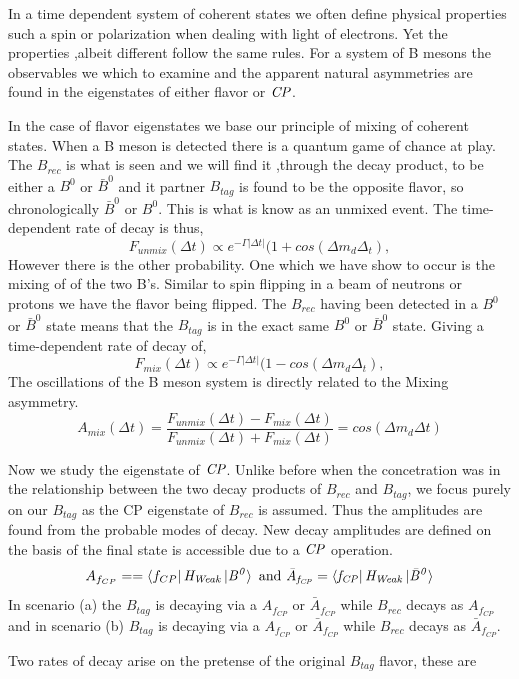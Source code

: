 In a time dependent system of coherent states we often define physical properties such a spin or polarization when dealing with light of electrons. Yet the properties ,albeit different follow the same rules. For a system of B mesons the observables we which to examine and the apparent natural asymmetries are found in the eigenstates of either flavor or $\it{CP}$. 

In the case of flavor eigenstates we base our principle of mixing of coherent states. When a B meson is detected there is a quantum game of chance at play. The $B_{rec}$ is what is seen and we will find it ,through the decay product, to be either a $B^0$ or $\bar{B}^0$ and it partner $B_{tag}$ is found to be the opposite flavor, so  chronologically $\bar{B}^0$ or $B^0$. This is what is know as an unmixed event. The time-dependent rate of decay is thus,
\[F_{unmix}(\Delta t) \propto e^{-\Gamma\left|\Delta t\right|}(1 + cos(\Delta m_d \Delta_t),\]
However there is the other probability. One which we have show to occur is the mixing of of the two B's. Similar to spin flipping in a beam of neutrons or protons we have the flavor being flipped. The $B_{rec}$ having been detected in a $B^0$ or $\bar{B}^0$ state means that the $B_{tag}$ is in the exact same $B^0$ or $\bar{B}^0$ state. Giving a time-dependent rate of decay of,
\[F_{mix}(\Delta t) \propto e^{-\Gamma\left|\Delta t\right|}(1 - cos(\Delta m_d \Delta_t),\]
The oscillations of the B meson system is directly related to the Mixing asymmetry.
\[A_{mix}(\Delta t) = \frac{F_{unmix}(\Delta t)-F_{mix}(\Delta t)}{F_{unmix}(\Delta t)+F_{mix}(\Delta t)} = cos(\Delta m_d\Delta t) \]

Now we study the eigenstate of $\it{CP}$. Unlike before when the concetration was in the relationship between the two decay products of $B_{rec}$ and $B_{tag}$, we focus purely on our $B_{tag}$ as the CP eigenstate of $B_{rec}$ is assumed. Thus the amplitudes are found from the probable modes of decay. New decay amplitudes are defined on the basis of the final state is accessible due to a $\it{CP}$ operation.
\[A_{f_{CP}}==\bra{f_{CP}}\it{H_{Weak}}\ket{B^{0}} \mbox{ and } \bar{A}_{f_{CP}}=\bra{f_{CP}}\it{H_{Weak}}\ket{\bar{B}^{0}}\]
In scenario (a) the $B_{tag}$ is decaying via a $A_{f_{CP}}$ or $\bar{A}_{f_{CP}}$ while $B_{rec}$ decays as $A_{f_{CP}}$ and in scenario (b) $B_{tag}$ is decaying via a $A_{f_{CP}}$ or $\bar{A}_{f_{CP}}$ while $B_{rec}$ decays as $\bar{A}_{f_{CP}}$. 

Two rates of decay arise on the pretense of the original $B_{tag}$ flavor, these are

